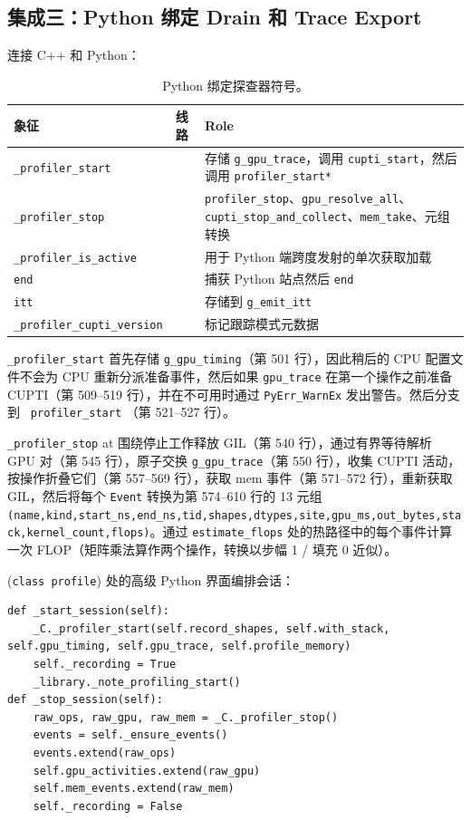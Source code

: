 \subsection{集成三：Python 绑定 Drain 和 Trace Export}

连接 C++ 和 Python：

\begin{table}[H]
\centering
\caption{Python 绑定探查器符号。}
\label{tab:pyprof}
\small
\begin{tabular}{lll}
\toprule
象征 & 线路 & Role \\
\midrule
\texttt{\_profiler\_start} &  & 存储 \texttt{g\_gpu\_trace}，调用 \texttt{cupti\_start}，然后调用 \texttt{profiler\_start*} \\
\texttt{\_profiler\_stop} &  & \texttt{profiler\_stop}、\texttt{gpu\_resolve\_all}、\texttt{cupti\_stop\_and\_collect}、\texttt{mem\_take}、元组转换 \\
\texttt{\_profiler\_is\_active} &  & 用于 Python 端跨度发射的单次获取加载 \\
\texttt{end} &  & 捕获 Python 站点然后 \texttt{end} \\
\texttt{itt} &  & 存储到 \texttt{g\_emit\_itt} \\
\texttt{\_profiler\_cupti\_version} &  & 标记跟踪模式元数据 \\
\bottomrule
\end{tabular}
\end{table}

\texttt{\_profiler\_start} 首先存储 \texttt{g\_gpu\_timing}（第 501 行），因此稍后的 CPU 配置文件不会为 CPU 重新分派准备事件，然后如果 \texttt{gpu\_trace} 在第一个操作之前准备 CUPTI（第 509--519 行），并在不可用时通过 \texttt{PyErr\_WarnEx} 发出警告。然后分支到 \texttt{ profiler\_start} （第 521--527 行）。

\texttt{\_profiler\_stop} at 围绕停止工作释放 GIL（第 540 行），通过有界等待解析 GPU 对（第 545 行），原子交换 \texttt{g\_gpu\_trace}（第 550 行），收集 CUPTI 活动，按操作折叠它们（第 557--569 行），获取 mem 事件（第 571--572 行），重新获取 GIL，然后将每个 \texttt{Event} 转换为第 574--610 行的 13 元组 \texttt{(name,kind,start\_ns,end\_ns,tid,shapes,dtypes,site,gpu\_ms,out\_bytes,stack,kernel\_count,flops)}。通过 \texttt{estimate\_flops} 处的热路径中的每个事件计算一次 FLOP（矩阵乘法算作两个操作，转换以步幅 1 / 填充 0 近似）。

(\texttt{class profile}) 处的高级 Python 界面编排会话：

\begin{lstlisting}[caption={session start/stop.}, label=lst:profilerpy, style=pystyle]
def _start_session(self):
    _C._profiler_start(self.record_shapes, self.with_stack, self.gpu_timing, self.gpu_trace, self.profile_memory)
    self._recording = True
    _library._note_profiling_start()
def _stop_session(self):
    raw_ops, raw_gpu, raw_mem = _C._profiler_stop()
    events = self._ensure_events()
    events.extend(raw_ops)
    self.gpu_activities.extend(raw_gpu)
    self.mem_events.extend(raw_mem)
    self._recording = False
\end{lstlisting}

